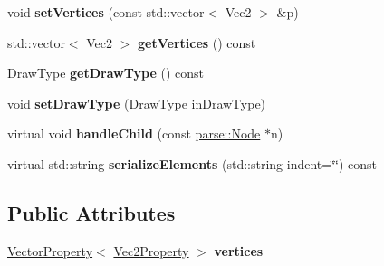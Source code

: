 \begin{DoxyCompactItemize}
\item 
\hypertarget{classg2c_1_1_polygon_a2d922954ae58da55a56b95befa1a87c2}{
void {\bfseries setVertices} (const std::vector$<$ Vec2 $>$ \&p)}
\label{classg2c_1_1_polygon_a2d922954ae58da55a56b95befa1a87c2}

\item 
\hypertarget{classg2c_1_1_polygon_ae9160bb2b95bbda133d5997d64353ec7}{
std::vector$<$ Vec2 $>$ {\bfseries getVertices} () const }
\label{classg2c_1_1_polygon_ae9160bb2b95bbda133d5997d64353ec7}

\item 
\hypertarget{classg2c_1_1_polygon_ae83e26d35197dc46fec2d024acd45978}{
DrawType {\bfseries getDrawType} () const }
\label{classg2c_1_1_polygon_ae83e26d35197dc46fec2d024acd45978}

\item 
\hypertarget{classg2c_1_1_polygon_adb8ac9391e5be1530bfcf95cfd815496}{
void {\bfseries setDrawType} (DrawType inDrawType)}
\label{classg2c_1_1_polygon_adb8ac9391e5be1530bfcf95cfd815496}

\item 
\hypertarget{classg2c_1_1_polygon_a757e0759a31ee87c6676c89ebb92db8f}{
virtual void {\bfseries handleChild} (const \hyperlink{classparse_1_1_node}{parse::Node} $\ast$n)}
\label{classg2c_1_1_polygon_a757e0759a31ee87c6676c89ebb92db8f}

\item 
\hypertarget{classg2c_1_1_polygon_a3960ba169b09bf89380f1bdda74111e0}{
virtual std::string {\bfseries serializeElements} (std::string indent=\char`\"{}\char`\"{}) const }
\label{classg2c_1_1_polygon_a3960ba169b09bf89380f1bdda74111e0}

\end{DoxyCompactItemize}
\subsection*{Public Attributes}
\begin{DoxyCompactItemize}
\item 
\hypertarget{classg2c_1_1_polygon_a43201567ddff9189372dbf55f33ec454}{
\hyperlink{classg2c_1_1_vector_property}{VectorProperty}$<$ \hyperlink{classg2c_1_1_vec2_property}{Vec2Property} $>$ {\bfseries vertices}}
\label{classg2c_1_1_polygon_a43201567ddff9189372dbf55f33ec454}

\end{DoxyCompactItemize}
